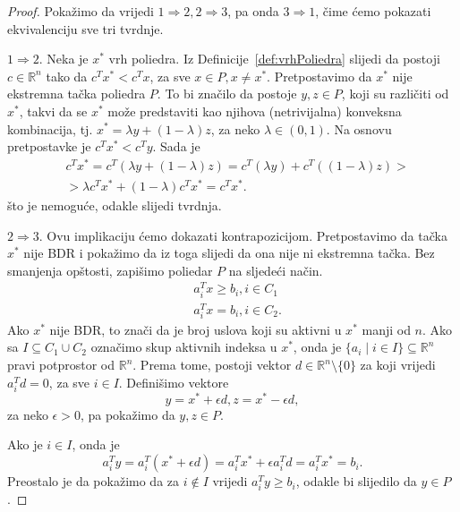 \documentclass[b5paper, utf8, 11pt, colorlinks]{book}
\theoremstyle{definition}
\begin{document}
\begin{proof}
      Pokažimo da vrijedi $1 \Rightarrow 2, 2 \Rightarrow 3$, pa onda $3 \Rightarrow 1$, čime ćemo pokazati ekvivalenciju sve tri tvrdnje.
      
      $1 \Rightarrow 2$. Neka je $x^*$ vrh poliedra. Iz Definicije~\ref{def:vrhPoliedra} slijedi da 
      postoji $c\in \mathbb{R}^n$ tako da $c^Tx^* < c^T x$, za sve $x \in P, x \neq x^*$. Pretpostavimo da $x^*$ nije ekstremna tačka poliedra $P$. 
      To bi značilo da postoje $y,z \in P$, koji su različiti od $x^*$, takvi da se $x^*$ može predstaviti kao njihova (netrivijalna) konveksna kombinacija, tj. $x^* = \lambda y + (1 - \lambda) z $, za neko $\lambda \in (0,1 )$. Na osnovu pretpostavke je $c^T x^* < c^T y$.  Sada je 
      \begin{align}
          &c^T x^* = c^T ( \lambda y + (1 - \lambda) z )  = c^T( \lambda y) + c^T((1- \lambda) z) > \nonumber \\
          &>\lambda c^T x^* + ( 1 - \lambda) c^T x^* = c^T x^*.
      \end{align}
      što je nemoguće, odakle slijedi tvrdnja. 
      
      $2 \Rightarrow 3$.
       Ovu implikaciju ćemo dokazati kontrapozicijom. Pretpostavimo da tačka $x^*$ nije BDR i pokažimo da iz toga slijedi da ona nije ni ekstremna tačka.
      Bez smanjenja opštosti, zapišimo poliedar $P$ na sljedeći način.
       \begin{align}
            & a_i^T x \geq b_i, i \in C_1 \\
            & a_i^T x  = b_i, i \in C_2.
       \end{align}
       Ako $x^*$ nije BDR, to znači da je broj uslova koji su aktivni u $x^*$ manji od $n$. 
       Ako sa $I \subseteq C_1 \cup C_2$ označimo skup aktivnih indeksa u $x^*$, onda 
       je $\{ a_i \mid i \in I \} \subseteq \mathbb{R}^n$ pravi potprostor od $\mathbb{R}^n$.  Prema tome, postoji vektor $d \in \mathbb{R}^n \setminus \{0\}$ za koji vrijedi $a_i^T d = 0$, za sve $i \in I$. Definišimo vektore 
       $$ y = x^* + \epsilon d, z = x^* - \epsilon d, $$
       za neko $\epsilon > 0$, pa pokažimo da $y, z \in P$.
       
       Ako je $i \in I$, onda je $$a_i^T y = a_i^T (x^* + \epsilon d) = a_i^T x^* + \epsilon a_i^T d = a_i^T x^* = b_i. $$ Preostalo je da pokažimo da za $i \not \in I$ vrijedi $a_i^T y \geq b_i$, odakle bi slijedilo da $y \in P$. 
       

\end{proof}
\end{document}
